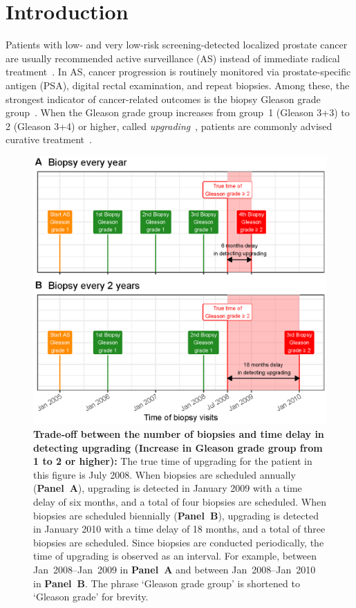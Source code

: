 \section{Introduction}
Patients with low- and very low-risk screening-detected localized prostate cancer are usually recommended active surveillance (AS) instead of immediate radical treatment~\citep{briganti2018active}. In AS, cancer progression is routinely monitored via prostate-specific antigen (PSA), digital rectal examination, and repeat biopsies. Among these, the strongest indicator of cancer-related outcomes is the biopsy Gleason grade group~\citep{epsteinGG2014}. When the Gleason grade group increases from group~1 (Gleason 3+3) to 2 (Gleason 3+4) or higher, called \textit{upgrading}~\citep{bruinsma2017expert}, patients are commonly advised curative treatment~\citep{bul2013active}.

\begin{figure}
\centerline{\includegraphics[width=\columnwidth]{images/delay_explanation.eps}}
\caption{\textbf{Trade-off between the number of biopsies and time delay in detecting upgrading (Increase in Gleason grade group from 1 to 2 or higher):} The true time of upgrading for the patient in this figure is July 2008. When biopsies are scheduled annually (\textbf{Panel~A}), upgrading is detected in January 2009 with a time delay of six months, and a total of four biopsies are scheduled. When biopsies are scheduled biennially (\textbf{Panel~B}), upgrading is detected in January 2010 with a time delay of 18 months, and a total of three biopsies are scheduled. Since biopsies are conducted periodically, the time of upgrading is observed as an interval. For example, between Jan~2008--Jan~2009 in \textbf{Panel~A} and between Jan~2008--Jan~2010 in \textbf{Panel~B}. The phrase `Gleason grade group' is shortened to `Gleason grade' for brevity.}
\label{fig:delay_explanation}
\end{figure}


